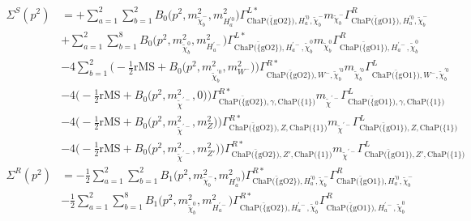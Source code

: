 \begin{itemize}
\begin{align} 
\Sigma^S(p^2) &= +\sum_{a=1}^{2}\sum_{b=1}^{2}{B_0\Big(p^{2},m^2_{\tilde{\chi}^-_{{b}}},m^2_{H^{'0}_{{a}}}\Big)} {\Gamma^{L*}_{\bar{\text{ChaP}\Big(\{\text{gO2}\}\Big)},H^{'0}_{{a}},\tilde{\chi}^-_{{b}}}} m_{\tilde{\chi}^-_{{b}}} {\Gamma^R_{\bar{\text{ChaP}\Big(\{\text{gO1}\}\Big)},H^{'0}_{{a}},\tilde{\chi}^-_{{b}}}} \nonumber \\ 
 &+\sum_{a=1}^{2}\sum_{b=1}^{8}{B_0\Big(p^{2},m^2_{\tilde{\chi}^0_{{b}}},m^2_{H^{'-}_{{a}}}\Big)} {\Gamma^{L*}_{\bar{\text{ChaP}\Big(\{\text{gO2}\}\Big)},H^{'-}_{{a}},\tilde{\chi}^0_{{b}}}} m_{\tilde{\chi}^0_{{b}}} {\Gamma^R_{\bar{\text{ChaP}\Big(\{\text{gO1}\}\Big)},H^{'-}_{{a}},\tilde{\chi}^0_{{b}}}} \nonumber \\ 
 &-4 \sum_{b=1}^{2}\Big(-\frac{1}{2} \text{rMS}  + {B_0\Big(p^{2},m^2_{\tilde{\chi}^{'0}_{{b}}},m^2_{W^-}\Big)}\Big){\Gamma^{R*}_{\bar{\text{ChaP}\Big(\{\text{gO2}\}\Big)},W^-,\tilde{\chi}^{'0}_{{b}}}} m_{\tilde{\chi}^{'0}_{{b}}} {\Gamma^L_{\bar{\text{ChaP}\Big(\{\text{gO1}\}\Big)},W^-,\tilde{\chi}^{'0}_{{b}}}}  \nonumber \\ 
 &-4 \Big(-\frac{1}{2} \text{rMS}  + {B_0\Big(p^{2},m^2_{\tilde{\chi}^{'-}},0\Big)}\Big){\Gamma^{R*}_{\bar{\text{ChaP}\Big(\{\text{gO2}\}\Big)},\gamma,\text{ChaP}\Big(\{1\}\Big)}} m_{\tilde{\chi}^{'-}} {\Gamma^L_{\bar{\text{ChaP}\Big(\{\text{gO1}\}\Big)},\gamma,\text{ChaP}\Big(\{1\}\Big)}} \nonumber \\ 
 &-4 \Big(-\frac{1}{2} \text{rMS}  + {B_0\Big(p^{2},m^2_{\tilde{\chi}^{'-}},m^2_{Z}\Big)}\Big){\Gamma^{R*}_{\bar{\text{ChaP}\Big(\{\text{gO2}\}\Big)},Z,\text{ChaP}\Big(\{1\}\Big)}} m_{\tilde{\chi}^{'-}} {\Gamma^L_{\bar{\text{ChaP}\Big(\{\text{gO1}\}\Big)},Z,\text{ChaP}\Big(\{1\}\Big)}} \nonumber \\ 
 &-4 \Big(-\frac{1}{2} \text{rMS}  + {B_0\Big(p^{2},m^2_{\tilde{\chi}^{'-}},m^2_{{Z'}}\Big)}\Big){\Gamma^{R*}_{\bar{\text{ChaP}\Big(\{\text{gO2}\}\Big)},{Z'},\text{ChaP}\Big(\{1\}\Big)}} m_{\tilde{\chi}^{'-}} {\Gamma^L_{\bar{\text{ChaP}\Big(\{\text{gO1}\}\Big)},{Z'},\text{ChaP}\Big(\{1\}\Big)}} \\ 
\Sigma^R(p^2) &= -\frac{1}{2} \sum_{a=1}^{2}\sum_{b=1}^{2}{B_1\Big(p^{2},m^2_{\tilde{\chi}^-_{{b}}},m^2_{H^{'0}_{{a}}}\Big)} {\Gamma^{R*}_{\bar{\text{ChaP}\Big(\{\text{gO2}\}\Big)},H^{'0}_{{a}},\tilde{\chi}^-_{{b}}}} {\Gamma^R_{\bar{\text{ChaP}\Big(\{\text{gO1}\}\Big)},H^{'0}_{{a}},\tilde{\chi}^-_{{b}}}}  \nonumber \\ 
 &-\frac{1}{2} \sum_{a=1}^{2}\sum_{b=1}^{8}{B_1\Big(p^{2},m^2_{\tilde{\chi}^0_{{b}}},m^2_{H^{'-}_{{a}}}\Big)} {\Gamma^{R*}_{\bar{\text{ChaP}\Big(\{\text{gO2}\}\Big)},H^{'-}_{{a}},\tilde{\chi}^0_{{b}}}} {\Gamma^R_{\bar{\text{ChaP}\Big(\{\text{gO1}\}\Big)},H^{'-}_{{a}},\tilde{\chi}^0_{{b}}}}  \nonumber \\ 

\end{align}
\end{itemize}

